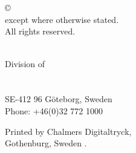 \newpage
\thispagestyle{empty}

\vspace{2cm} \noindent \textbf
\mytitle\\

\noindent
\textsc{\authorname}\\

\vskip 0.5cm\noindent
\copyright~\currentyear \space \authorname \\
\noindent
except where otherwise stated. \\
All rights reserved. \vspace{1cm}


\vfill

\noindent \identifierNoText
\mydepartment\\
Division of \division\\
\ifx\researchgroup\undefined\else\researchgroup\\\fi
\chalIgu\\
SE-412 96 Göteborg, Sweden\\
Phone: +46(0)32 772 1000

\vskip 1.5cm

\noindent
Printed by Chalmers Digitaltryck,\\
Gothenburg, Sweden \currentyear.
